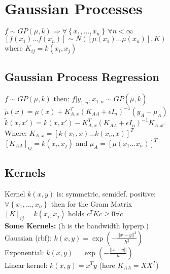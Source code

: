 \section{Gaussian Processes}
$f\sim GP(\mu,k)\Rightarrow\forall \left\{x_1, \dots, x_n\right\} \,\forall n < \infty$\\
$\left[f(x_1)\dots f(x_n)\right]\sim N(\left[\mu(x_1)\dots \mu(x_n)\right], K)$\\ where $K_{ij}=k(x_i,x_j)$
\subsection{Gaussian Process Regression}
$f\sim GP(\mu,k)$ then: $f\vert y_{1:n},x_{1:n} \sim GP(\tilde{\mu},\tilde{k})$\\
$\tilde{\mu}(x) = \mu(x) + K_{A, x}^T{(K_{AA}+\epsilon I_n)}^{-1}\left(y_A-\mu_A\right)$\\
$\tilde{k}(x,x') = k(x,x') - K_{A,x}^T{(K_{AA}+\epsilon I_n)}^{-1} K_{A,x'}$\\
Where: $K_{A,x} = {\left[k(x_1,x)\dots k(x_n,x)\right]}^T$\\
${\left[K_{AA}\right]}_{ij} = k(x_i, x_j)$ and $\mu_A = {\left[\mu(x_1 \dots x_n)\right]}^T$


\subsection{Kernels}
	Kernel $k(x,y)$ is: symmetric, semidef. positive:\\
	$\forall \left\{x_1, \dots, x_n \right\}$ then for the Gram Matrix \\
	${\left[K\right]}_{ij}=k(x_i,x_j)$ holds $c^TKc\geq0\forall c$\\
    \textbf{Some Kernels:} (h is the bandwidth hyperp.)\\
    Gaussian (rbf): $k(x,y) = \exp( -\tfrac{||x-y||^2}{h^2})$\\
    Exponential: $k(x,y) = \exp( -\tfrac{||x-y||}{h})$\\
    Linear kernel: $k(x,y) = x^Ty$ (here $K_{AA} = XX^T$)
